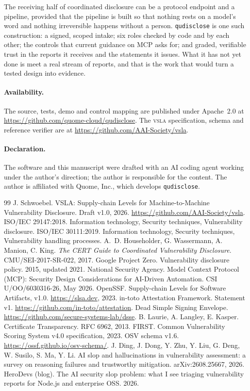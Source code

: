 \documentclass[11pt]{article}
\newcommand{\qud}{\texttt{qudisclose}}
\newcommand{\vsla}{\textsc{vsla}}
\begin{document}
The receiving half of coordinated disclosure can be a protocol endpoint and a pipeline, provided that the
pipeline is built so that nothing rests on a model's word and nothing irreversible happens without a person.
\qud{} is one such construction: a signed, scoped intake; six roles checked by code and by each other; the
controls that current guidance on MCP asks for; and graded, verifiable trust in the reports it receives and the
statements it issues. What it has not yet done is meet a real stream of reports, and that is the work that
would turn a tested design into evidence.

\paragraph{Availability.} The source, tests, demo and control mapping are published under Apache~2.0 at
\url{https://github.com/quome-cloud/qudisclose}. The \vsla{} specification, schema and
reference verifier are at \url{https://github.com/AAI-Society/vsla}.

\paragraph{Declaration.} The software and this manuscript were drafted with an AI coding agent working under
the author's direction; the author is responsible for the content. The author is affiliated with Quome, Inc.,
which develops \qud{}.

\begin{thebibliography}{99}\small
{} J. Schwoebel. VSLA: Supply-chain Levels for Machine-to-Machine Vulnerability Disclosure. Draft v1.0, 2026. \url{https://github.com/AAI-Society/vsla}.
 ISO/IEC 29147:2018. Information technology, Security techniques, Vulnerability disclosure.
 ISO/IEC 30111:2019. Information technology, Security techniques, Vulnerability handling processes.
 A.~D. Householder, G. Wassermann, A. Manion, C. King. \emph{The CERT Guide to Coordinated Vulnerability Disclosure}. CMU/SEI-2017-SR-022, 2017.
 Google Project Zero. Vulnerability disclosure policy. 2015, updated 2021.
 National Security Agency. Model Context Protocol (MCP): Security Design Considerations for AI-Driven Automation. CSI U/OO/6030316-26, May 2026.
 OpenSSF. Supply-chain Levels for Software Artifacts, v1.0. \url{https://slsa.dev}, 2023.
 in-toto Attestation Framework. Statement v1. \url{https://github.com/in-toto/attestation}.
 Dead Simple Signing Envelope. \url{https://github.com/secure-systems-lab/dsse}.
 B. Laurie, A. Langley, E. Kasper. Certificate Transparency. RFC 6962, 2013.
 FIRST. Common Vulnerability Scoring System v4.0 specification, 2023.
 OSV schema v1.6. \url{https://ossf.github.io/osv-schema/}.
 J. Ding, J. Dong, Y. Zhu, Y. Liu, G. Deng, W. Susilo, S. Ma, Y. Li. AI slop and hallucinations in vulnerability assessment: a survey on reasoning failures and trustworthy mitigation. arXiv:2608.25667, 2026.
 HeroDevs (blog). The AI security slop problem: what I see triaging vulnerability reports for Node.js and enterprise OSS. 2026.
\end{thebibliography}
\end{document}
